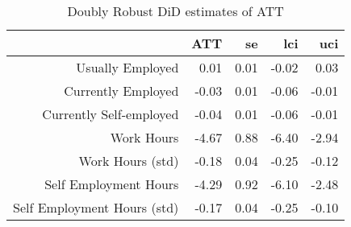 \begin{table}[ht]
\centering
\begin{tabular}{rrrrr}
  \toprule
 & ATT & se & lci & uci \\ 
  \midrule
Usually Employed & 0.01 & 0.01 & -0.02 & 0.03 \\ 
  Currently Employed & -0.03 & 0.01 & -0.06 & -0.01 \\ 
  Currently Self-employed & -0.04 & 0.01 & -0.06 & -0.01 \\ 
  Work Hours & -4.67 & 0.88 & -6.40 & -2.94 \\ 
  Work Hours (std) & -0.18 & 0.04 & -0.25 & -0.12 \\ 
  Self Employment Hours & -4.29 & 0.92 & -6.10 & -2.48 \\ 
  Self Employment Hours (std) & -0.17 & 0.04 & -0.25 & -0.10 \\ 
   \bottomrule
\end{tabular}
\caption{Doubly Robust DiD estimates of ATT} 
\end{table}
